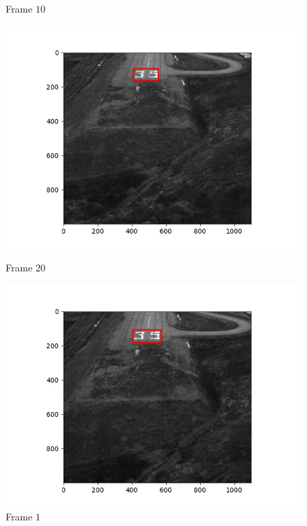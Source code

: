 \begin{figure}[H]
\begin{minipage}{.49\textwidth}
    \caption{Frame $10$}
  \end{minipage}
  \hfill
  \begin{minipage}{.49\textwidth}
    \centering
    \includegraphics[width=\textwidth]{./figures/ic_affine/landing/frame000020.jpg}
    \caption{Frame $20$}
  \end{minipage}
  \begin{minipage}{.49\textwidth}
    \centering
    \includegraphics[width=\textwidth]{./figures/ic_affine/landing/frame000030.jpg}
    \caption{Frame $1$}
  \end{minipage}
  \hfill
  \begin{minipage}{.49\textwidth}
    \centering

\end{minipage}
\end{figure}
